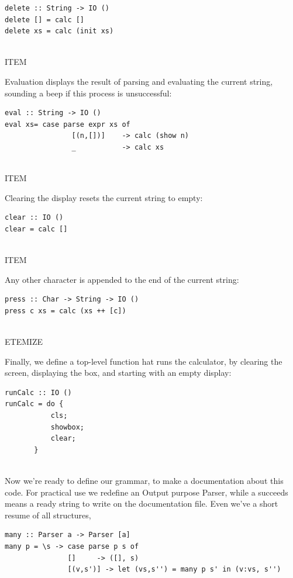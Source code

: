 \documentclass[a4papert]{article}
\begin{document}
\begin{lstlisting}[style=haskellstyle]
delete :: String -> IO ()
delete [] = calc []
delete xs = calc (init xs)


\end{lstlisting}
ITEM

Evaluation displays the result of parsing and evaluating the current string, sounding a beep if this process is unsuccessful:

\begin{lstlisting}[style=haskellstyle]
eval :: String -> IO ()
eval xs= case parse expr xs of
                [(n,[])]    -> calc (show n)
                _           -> calc xs


\end{lstlisting}
ITEM

Clearing the display resets the current string to empty:

\begin{lstlisting}[style=haskellstyle]
clear :: IO ()
clear = calc []


\end{lstlisting}
ITEM

Any other character is appended to the end of the current string:

\begin{lstlisting}[style=haskellstyle]
press :: Char -> String -> IO ()
press c xs = calc (xs ++ [c])


\end{lstlisting}
ETEMIZE


Finally, we define a top-level function hat runs the calculator, by clearing the screen, displaying the box, and starting with an empty display:

\begin{lstlisting}[style=haskellstyle]
runCalc :: IO ()
runCalc = do {
           cls;
           showbox;
           clear;
       }


\end{lstlisting}
Now we're ready to define our grammar, to make a documentation about this code. For practical use we redefine an Output purpose Parser, while a succeeds means a ready string to write on the documentation file. Even we've a short resume of all structures,


\begin{lstlisting}[style=haskellstyle]
many :: Parser a -> Parser [a]
many p = \s -> case parse p s of
               []     -> ([], s)
               [(v,s')] -> let (vs,s'') = many p s' in (v:vs, s'')
\end{lstlisting}
\end{document}
